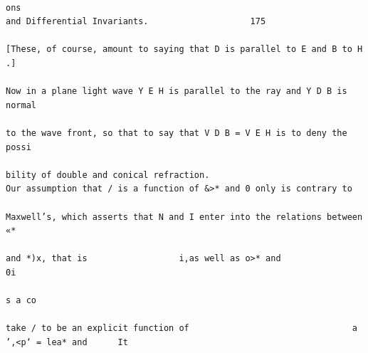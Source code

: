 \documentclass[10pt]{article}
\begin{document}
\clearpage
\begin{verbatim}

ons                                                                                                          and Differential Invariants.                    175

[These, of course, amount to saying that D is parallel to E and B to H .]
                                                                       Now in a plane light wave Y E H is parallel to the ray and Y D B is normal
                                                                       to the wave front, so that to say that V D B = V E H is to deny the possi­
                                                                       bility of double and conical refraction.
Our assumption that / is a function of &>* and 0 only is contrary to
                                                                       Maxwell’s, which asserts that N and I enter into the relations between «*
                                                                       and *)x, that is                  i,as well as o>* and                                  0i
                                                                                      s a co
                                                                        take / to be an explicit function of                                a ’,<p‘ = lea* and      It





\end{verbatim}
\end{document}
